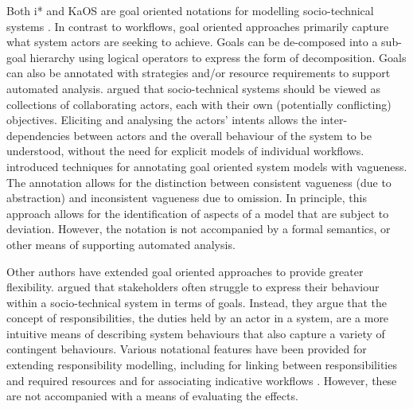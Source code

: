\documentclass{llncs}
\begin{document}
Both i* \citep{yu1995social} and KaOS \citep{dardenne93goal} are goal oriented notations for modelling socio-technical
systems \cite{werneck2009goreistarkaos}.  In contrast to workflows, goal oriented approaches primarily capture what
system actors are seeking to achieve.  Goals can be de-composed into a sub-goal hierarchy using logical operators to
express the form of decomposition. Goals can also be annotated with strategies and/or resource requirements to support
automated analysis.  \citet{yu1995social} argued that socio-technical systems should be viewed as collections of
collaborating actors, each with their own (potentially conflicting) objectives.  Eliciting and analysing the actors'
intents allows the inter-dependencies between actors and the overall behaviour of the system to be understood, without
the need for explicit models of individual workflows. \citet{herrmann1999vagueness} introduced techniques for annotating
goal oriented system models with vagueness.  The annotation allows for the distinction between consistent vagueness (due
to abstraction) and inconsistent vagueness due to omission.  In principle, this approach allows for the identification
of aspects of a model that are subject to deviation.  However, the notation is not accompanied by a formal semantics,
or other means of supporting automated analysis.

Other authors have extended goal oriented approaches to provide greater flexibility. \citet{sommerville09deriving}
argued that stakeholders often struggle to express their behaviour within a socio-technical system in terms of goals.
Instead, they argue that the concept of responsibilities, the duties held by an actor in a system, are a more intuitive
means of describing system behaviours that also capture a variety of contingent behaviours.  Various notational features
have been provided for extending responsibility modelling, including for linking between responsibilities and required
resources and for associating indicative workflows \citep{dewsbury07responsibility}.  However, these are not accompanied
with a means of evaluating the effects.
\end{document}
